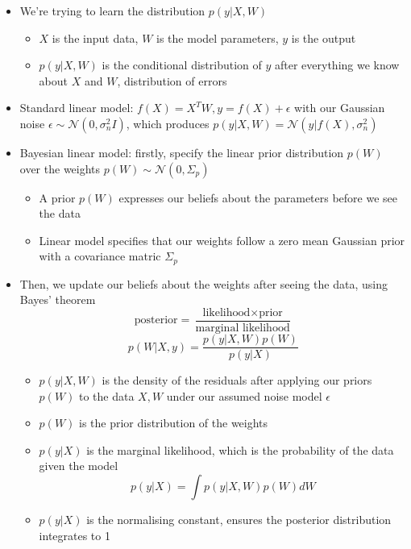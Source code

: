 \documentclass[12pt]{article}
\begin{document}
\begin{itemize}
    \item We're trying to learn the distribution $p(y|X,W)$
    \begin{itemize}
        \item $X$ is the input data, $W$ is the model parameters, $y$ is the output
        \item $p(y|X,W)$ is the conditional distribution of $y$ after everything we know about $X$ and $W$, distribution of errors
    \end{itemize}
    \item Standard linear model: $f(X) = X^T W, y = f(X) + \epsilon$ with our Gaussian noise $\epsilon \sim \mathcal{N}(0, \sigma^2_nI)$, which produces $p(y|X,W) = \mathcal{N}(y|f(X), \sigma^2_n)$
    \item Bayesian linear model: firstly, specify the linear prior distribution $p(W)$ over the weights $p(W) \sim \mathcal{N}(0, \Sigma_p)$
    \begin{itemize}
        \item A prior $p(W)$ expresses our beliefs about the parameters before we see the data
        \item Linear model specifies that our weights follow a zero mean Gaussian prior with a covariance matric $\Sigma_p$
    \end{itemize}
    \item Then, we update our beliefs about the weights after seeing the data, using Bayes' theorem
\begin{equation}
    \text{posterior} = \frac{\text{likelihood} \times \text{prior}}{\text{marginal likelihood}}
\end{equation}
\begin{equation}
    p(W|X, y) = \frac{p(y|X,W)p(W)}{p(y|X)}
\end{equation}
    \begin{itemize}
        \item $p(y|X,W)$ is the density of the residuals after applying our priors $p(W)$ to the data $X,W$ under our assumed noise model $\epsilon$
        \item $p(W)$ is the prior distribution of the weights
        \item $p(y|X)$ is the marginal likelihood, which is the probability of the data given the model
\begin{equation}
    p(y|X) = \int p(y|X,W)p(W)dW
\end{equation}
        \item $p(y|X)$ is the normalising constant, ensures the posterior distribution integrates to 1

\end{itemize}
\end{itemize}
\end{document}
